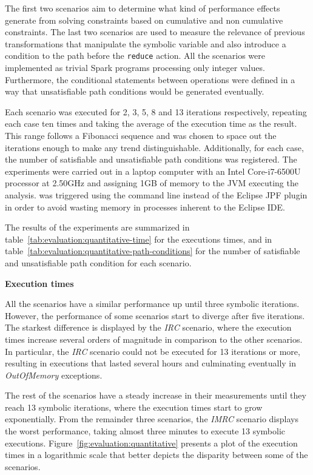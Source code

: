 The first two scenarios aim to determine what kind of performance effects generate from solving constraints based on cumulative and non cumulative constraints. The last two scenarios are used to measure the relevance of previous transformations that manipulate the symbolic variable and also introduce a condition to the path before the \texttt{reduce} action. All the scenarios were implemented as trivial Spark programs processing only integer values. Furthermore, the conditional statements between operations were defined in a way that unsatisfiable path conditions would be generated eventually.

Each scenario was executed for 2, 3, 5, 8 and 13 iterations respectively, repeating each case ten times and taking the average of the execution time as the result. This range follows a Fibonacci sequence and was chosen to space out the iterations enough to make any trend distinguishable. Additionally, for each case, the number of satisfiable and unsatisfiable path conditions was registered. The experiments were carried out in a laptop computer with an Intel Core-i7-6500U processor at 2.50GHz and assigning 1GB of memory to the JVM executing the analysis. \jpf{} was triggered using the command line instead of the Eclipse JPF plugin in order to avoid wasting memory in processes inherent to the Eclipse IDE.


The results of the experiments are summarized in table~\ref{tab:evaluation:quantitative-time} for the executions times, and in table~\ref{tab:evaluation:quantitative-path-conditions} for the number of satisfiable and unsatisfiable path condition for each scenario.

\textbf{Execution times}

All the scenarios have a similar performance up until three symbolic iterations. However, the performance of some scenarios start to diverge after five iterations. The starkest difference is displayed by the \textit{IRC} scenario, where the execution times increase several orders of magnitude in comparison to the other scenarios. In particular, the \textit{IRC} scenario could not be executed for 13 iterations or more, resulting in executions that lasted several hours and culminating eventually in \textit{OutOfMemory} exceptions.

The rest of the scenarios have a steady increase in their measurements until they reach 13 symbolic iterations, where the execution times start to grow exponentially. From the remainder three scenarios, the \textit{IMRC} scenario displays the worst performance, taking almost three minutes to execute 13 symbolic executions. Figure~\ref{fig:evaluation:quantitative} presents a plot of the execution times in a logarithmic scale that better depicts the disparity between some of the scenarios.

